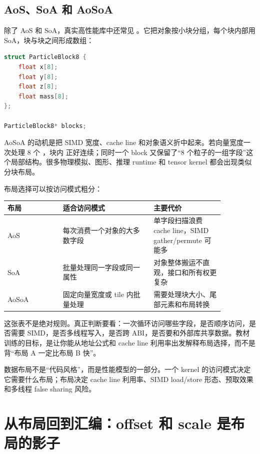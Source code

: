 \subsection{AoS、SoA 和 AoSoA}

除了 AoS 和 SoA，真实高性能库中还常见 。它把对象按小块分组，每个块内部用 SoA，块与块之间形成数组：

\begin{lstlisting}[language=C++]
struct ParticleBlock8 {
    float x[8];
    float y[8];
    float z[8];
    float mass[8];
};

ParticleBlock8* blocks;
\end{lstlisting}

AoSoA 的动机是把 SIMD 宽度、cache line 和对象语义折中起来。若向量宽度一次处理 8 个 ，块内  正好连续；同时一个 block 又保留了“8 个粒子的一组字段”这个局部结构。很多物理模拟、图形、推理 runtime 和 tensor kernel 都会出现类似分块布局。

布局选择可以按访问模式粗分：

\begin{center}
\begin{tabular}{p{0.22\linewidth}p{0.36\linewidth}p{0.28\linewidth}}
\toprule
布局 & 适合访问模式 & 主要代价 \\
\midrule
AoS & 每次消费一个对象的大多数字段 & 单字段扫描浪费 cache line，SIMD gather/permute 可能多 \\
SoA & 批量处理同一字段或同一属性 & 对象整体搬运不直观，接口和所有权更复杂 \\
AoSoA & 固定向量宽度或 tile 内批量处理 & 需要处理块大小、尾部元素和布局转换 \\
\bottomrule
\end{tabular}
\end{center}

这张表不是绝对规则。真正判断要看：一次循环访问哪些字段，是否顺序访问，是否需要 SIMD，是否多线程写入，是否跨 ABI，是否要和外部库共享数据。教材训练的目标，是让你能从地址公式和 cache line 利用率出发解释布局选择，而不是背“布局 A 一定比布局 B 快”。

\begin{keyidea}
数据布局不是“代码风格”，而是性能模型的一部分。一个 kernel 的访问模式决定它需要什么布局；布局决定 cache line 利用率、SIMD load/store 形态、预取效果和多线程 false sharing 风险。
\end{keyidea}

\section{从布局回到汇编：offset 和 scale 是布局的影子}

